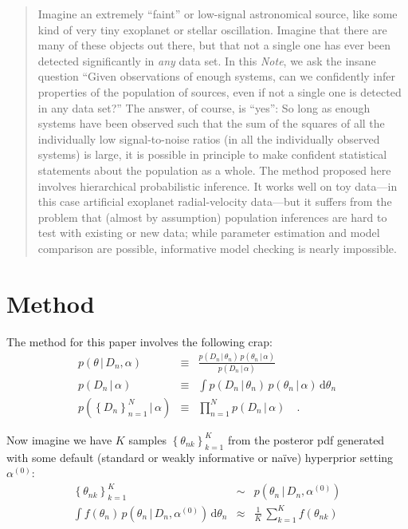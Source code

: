 \documentclass[12pt]{article}
\newcommand{\documentname}{\textsl{Note}}
\newcommand{\given}{\,|\,}
\newcommand{\dd}{\mathrm{d}}
\newcommand{\pdf}{{p}}
\newcommand{\setof}[1]{\left\{{#1}\right\}}
\newcommand{\data}{{D_n}}
\newcommand{\setofalldata}{\setof{\data}_{n=1}^N}
\newcommand{\parsymbol}{\theta}
\newcommand{\pars}{\parsymbol_n}
\newcommand{\hyperpars}{\alpha}
\newcommand{\sample}{\parsymbol_{nk}}
\newcommand{\default}[1]{{#1}^{(0)}}
\newcommand{\setofallsamples}{\setof{\sample}_{k=1}^K}
\begin{document}
\begin{abstract}
Imagine an extremely ``faint'' or low-signal astronomical source, like
some kind of very tiny exoplanet or stellar oscillation.  Imagine that
there are many of these objects out there, but that not a single one
has ever been detected significantly in \emph{any} data set.  In this
\documentname, we ask the insane question ``Given observations of
enough systems, can we confidently infer properties of the population
of sources, even if not a single one is detected in any data set?''
The answer, of course, is ``yes'': So long as enough systems have been
observed such that the sum of the squares of all the individually low
signal-to-noise ratios (in all the individually observed systems) is
large, it is possible in principle to make confident statistical
statements about the population as a whole.  The method proposed here
involves hierarchical probabilistic inference.  It works well on toy
data---in this case artificial exoplanet radial-velocity data---but it
suffers from the problem that (almost by assumption) population
inferences are hard to test with existing or new data; while parameter
estimation and model comparison are possible, informative model
checking is nearly impossible.
\end{abstract}

\section{Method}

The method for this paper involves the following crap:
\begin{eqnarray}
\pdf(\theta\given\data,\hyperpars)
  &\equiv&
\frac{\pdf(\data\given\pars)\,\pdf(\pars\given\hyperpars)}{\pdf(\data\given\hyperpars)}
\\
\pdf(\data\given\hyperpars)
  &\equiv&
\int \pdf(\data\given\pars)\,\pdf(\pars\given\hyperpars)\,\dd\pars
\\
\pdf(\setofalldata\given\hyperpars)
  &\equiv&
\prod_{n=1}^N \pdf(\data\given\hyperpars)
\quad.
\end{eqnarray}

Now imagine we have $K$ samples $\setofallsamples$ from the
posteror pdf generated with some default (standard or weakly
informative or na\"ive) hyperprior setting $\default{\hyperpars}$:
\begin{eqnarray}
\setofallsamples
 &\sim&
\pdf(\pars\given\data,\default{\hyperpars})
\\
\int f(\pars)\,\pdf(\pars\given\data,\default{\hyperpars})\,\dd\pars
 &\approx&
\frac{1}{K}\,\sum_{k=1}^K f(\sample)
\end{eqnarray}
\end{document}
